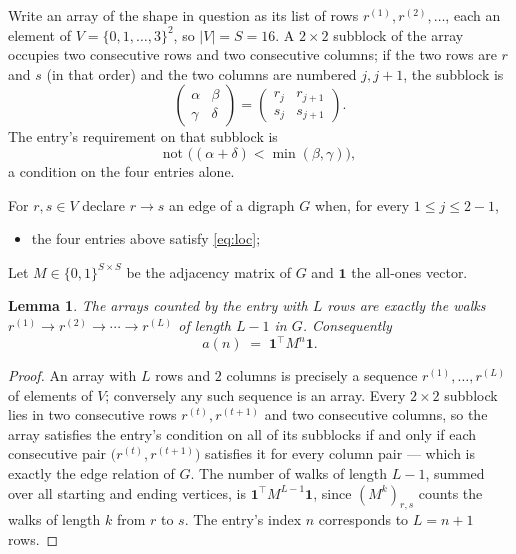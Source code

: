 \documentclass[11pt,a4paper]{article}
\theoremstyle{plain}
\newtheorem{lemma}[theorem]{Lemma}
\theoremstyle{definition}
\begin{document}
Write an array of the shape in question as its list of rows
$r^{(1)},r^{(2)},\dots$, each an element of
$V=\{0,1,\dots,3\}^{2}$, so $|V|=S=16$. A $2\times2$ subblock of the array
occupies two consecutive rows and two consecutive columns; if the two rows are $r$
and $s$ (in that order) and the two columns are numbered $j,j+1$,
the subblock is
\[
\begin{pmatrix}\alpha&\beta\\\gamma&\delta\end{pmatrix}=\begin{pmatrix}r_j&r_{j+1}\\s_j&s_{j+1}\end{pmatrix}.
\]
The entry's requirement on that subblock is
\begin{equation}\label{eq:loc}
\text{not }\bigl((\alpha+\delta)<\min(\beta,\gamma)\bigr),
\end{equation}
a condition on the four entries alone.

For $r,s\in V$ declare $r\to s$ an edge of a digraph $G$ when, for every
$1\le j\le 2-1$,
\begin{itemize}
\item the four entries above satisfy \eqref{eq:loc};

\end{itemize}
Let $M\in\{0,1\}^{S\times S}$ be the adjacency matrix of $G$ and $\mathbf{1}$ the
all-ones vector.

\begin{lemma}\label{lem:walk}
The arrays counted by the entry with $L$ rows are exactly the walks
$r^{(1)}\to r^{(2)}\to\cdots\to r^{(L)}$ of length $L-1$ in $G$. Consequently
\[
a(n)\;=\;\mathbf{1}^{\!\top}M^{n}\mathbf{1} .
\]
\end{lemma}

\begin{proof}
An array with $L$ rows and $2$ columns is precisely a sequence
$r^{(1)},\dots,r^{(L)}$ of elements of $V$; conversely any such sequence is an array.
Every $2\times2$ subblock lies in two consecutive rows $r^{(t)},r^{(t+1)}$ and two
consecutive columns, so the array satisfies the entry's condition on all of its subblocks
if and only if each consecutive pair $\bigl(r^{(t)},r^{(t+1)}\bigr)$ satisfies it for
every column pair --- which is exactly the edge relation of $G$. The number of walks of
length $L-1$, summed over all starting and ending vertices, is
$\mathbf{1}^{\!\top}M^{L-1}\mathbf{1}$, since $(M^{k})_{r,s}$ counts the walks of
length $k$ from $r$ to $s$. The entry's index $n$ corresponds to $L=n+1$ rows.
\end{proof}
\end{document}

